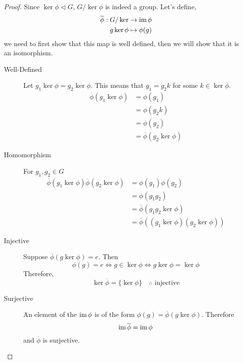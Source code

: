 \documentclass{article}
\begin{document}
\begin{proof}
    Since $\ker \phi \triangleleft G$, $G / \ker \phi$ is indeed a group. Let's define,
    \begin{align*}
        \overline{\phi}: G / \ker &\rightarrow \operatorname{im} \phi \\
        g\ker \phi &\mapsto \phi(g)
    \end{align*}
    we need to first show that this map is well defined, then we will show that it is an isomorphism.
    \begin{description}
        \item[Well-Defined] Let $g_1 \ker \phi = g_2 \ker \phi$. This means that $g_1 = g_2k$ for some $k \in \ker \phi$.
        \begin{align*}
            \overline{\phi}(g_1 \ker \phi) &= \phi(g_1) \\
            &= \phi(g_2k) \\
            &= \phi(g_2) \\
            &= \overline{\phi}(g_2 \ker \phi)
        \end{align*}
        \item[Homomorphism] For $g_1, g_2 \in G$
        \begin{align*}
            \overline{\phi}(g_1 \ker \phi)\overline{\phi}(g_2 \ker \phi) &= \phi(g_1)\phi(g_2)\\
            &=\phi(g_1g_2) \\
            &= \overline{\phi}(g_1g_2 \ker \phi) \\
            &= \overline{\phi}((g_1 \ker \phi)(g_2 \ker \phi))
        \end{align*}
        \item[Injective] Suppose $\overline{\phi}(g \ker \phi) = e$. Then
        \[
            \phi(g) = e \iff g \in \ker \phi \iff g \ker \phi = \ker \phi
        \]
        Therefore, 
        \[
            \ker \overline{\phi} = \{ \ker \phi \} \quad \therefore \text{ injective}  
        \]
        \item[Surjective] An element of the $\operatorname{im} \phi$ is of the form $\phi(g) = \overline{\phi}(g \ker\phi)$. Therefore
        \[
            \operatorname{im} \overline{\phi} = \operatorname{im} \phi  
        \]
        and $\overline{\phi}$ is surjective.
    \end{description}
\end{proof}
\end{document}
